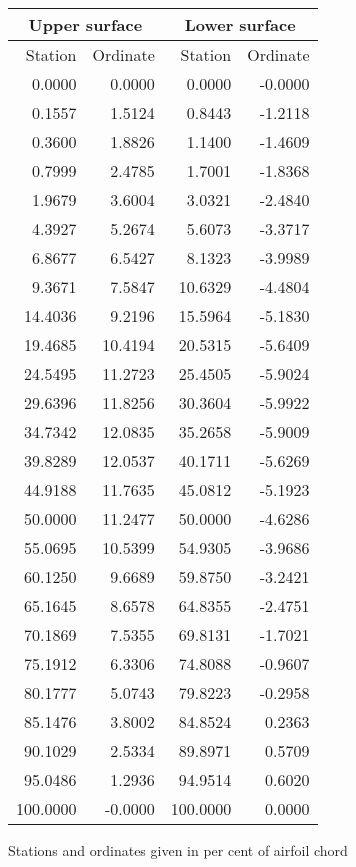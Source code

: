 \documentclass[11pt]{book}
\begin{document}
 \hspace{4mm}
 \begin{tabular}{|r|r|r|r|} \hline 
 \multicolumn{2}{|c|}{Upper surface} & \multicolumn{2}{|c|}{Lower surface} \\
 \hline
 Station & Ordinate & Station & Ordinate \\
 \hline
0.0000 & 0.0000 & 0.0000 & -0.0000 \\
0.1557 & 1.5124 & 0.8443 & -1.2118 \\
0.3600 & 1.8826 & 1.1400 & -1.4609 \\
0.7999 & 2.4785 & 1.7001 & -1.8368 \\
1.9679 & 3.6004 & 3.0321 & -2.4840 \\
4.3927 & 5.2674 & 5.6073 & -3.3717 \\
6.8677 & 6.5427 & 8.1323 & -3.9989 \\
9.3671 & 7.5847 & 10.6329 & -4.4804 \\
14.4036 & 9.2196 & 15.5964 & -5.1830 \\
19.4685 & 10.4194 & 20.5315 & -5.6409 \\
24.5495 & 11.2723 & 25.4505 & -5.9024 \\
29.6396 & 11.8256 & 30.3604 & -5.9922 \\
34.7342 & 12.0835 & 35.2658 & -5.9009 \\
39.8289 & 12.0537 & 40.1711 & -5.6269 \\
44.9188 & 11.7635 & 45.0812 & -5.1923 \\
50.0000 & 11.2477 & 50.0000 & -4.6286 \\
55.0695 & 10.5399 & 54.9305 & -3.9686 \\
60.1250 & 9.6689 & 59.8750 & -3.2421 \\
65.1645 & 8.6578 & 64.8355 & -2.4751 \\
70.1869 & 7.5355 & 69.8131 & -1.7021 \\
75.1912 & 6.3306 & 74.8088 & -0.9607 \\
80.1777 & 5.0743 & 79.8223 & -0.2958 \\
85.1476 & 3.8002 & 84.8524 & 0.2363 \\
90.1029 & 2.5334 & 89.8971 & 0.5709 \\
95.0486 & 1.2936 & 94.9514 & 0.6020 \\
100.0000 & -0.0000 & 100.0000 & 0.0000 \\
 \hline 
 \end{tabular}
 \vspace{8mm}

Stations and ordinates given in per cent of airfoil chord
\end{document}
